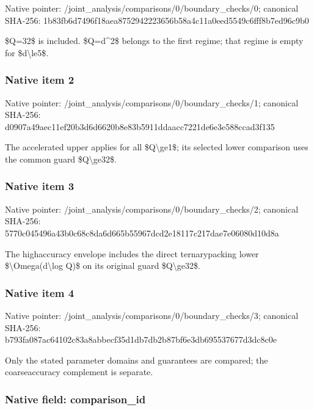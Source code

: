 \documentclass[10pt,a4paper]{article}
\begin{document}
Native pointer: /joint\_analysis/comparis\allowbreak{}ons/0/boundary\_checks/0; canonical SHA-256: 1b83fb6d7496f18aea875294\allowbreak{}2223656b58a4c11a0eed5549\allowbreak{}c6fff8b7ed96c9b0


\$Q=32\$ is included. \$Q=d\textasciicircum{}2\$ belongs to the first regime; that regime is empty for \$d\textbackslash{}le5\$.


\subsubsection{Native item 2}


Native pointer: /joint\_analysis/comparis\allowbreak{}ons/0/boundary\_checks/1; canonical SHA-256: d0907a49aec11ef20b3d6d66\allowbreak{}20b8e83b5911ddaacc7221de\allowbreak{}6e3e588ccad3f135


The accelerated upper applies for all \$Q\textbackslash{}ge1\$; its selected lower comparison uses the common guard \$Q\textbackslash{}ge32\$.


\subsubsection{Native item 3}


Native pointer: /joint\_analysis/comparis\allowbreak{}ons/0/boundary\_checks/2; canonical SHA-256: 5770c045496a43b0c68c8da6\allowbreak{}d665b55967dcd2e18117c217\allowbreak{}dae7e06080d10d8a


The highaccuracy envelope includes the direct ternarypacking lower \$\textbackslash{}Omega(d\textbackslash{}log Q)\$ on its original guard \$Q\textbackslash{}ge32\$.


\subsubsection{Native item 4}


Native pointer: /joint\_analysis/comparis\allowbreak{}ons/0/boundary\_checks/3; canonical SHA-256: b793fa087ac64102c83a8abb\allowbreak{}ecf35d1db7db2b87bf6e3db6\allowbreak{}95537677d3dc8c0e


Only the stated parameter domains and guarantees are compared; the coarseaccuracy complement is separate.


\subsubsection{Native field: comparison\_id}
\end{document}
